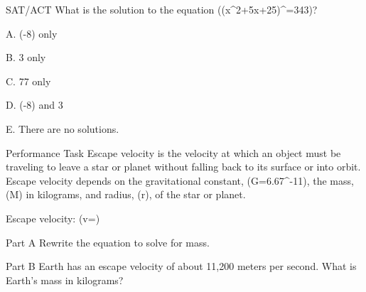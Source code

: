 \documentclass{article}
\newenvironment{practice}[2]{}{}        %
\newcommand{\answer}[1]{}               %
\newcommand{\placeholder}[2]{}          %
\begin{document}
\begin{practice}{45}{1}
SAT/ACT What is the solution to the equation ((x^2+5x+25)^{}=343)?

A. (-8) only

B. 3 only

C. 77 only

D. (-8) and 3

E. There are no solutions.
\answer{D. (-8) and 3}
\end{practice}

\begin{practice}{46}{2}
Performance Task Escape velocity is the velocity at which an object must be traveling to leave a star or planet without falling back to its surface or into orbit. Escape velocity depends on the gravitational constant, (G=6.67^{-11}), the mass, (M) in kilograms, and radius, (r), of the star or planet.

Escape velocity: (v=)

\placeholder{illustration}{Earth with a rocket path and labels "Escape velocity: (v=\sqrt{\frac{2GM}{r}})" and "Earth's radius = 6,371,000 m".}

Part A Rewrite the equation to solve for mass.

Part B Earth has an escape velocity of about 11,200 meters per second. What is Earth's mass in kilograms?
\answer{Part A (M=\frac{v^2r}{2G}). Part B (M\approx5.99\times10^{24}).}
\end{practice}
\end{document}
